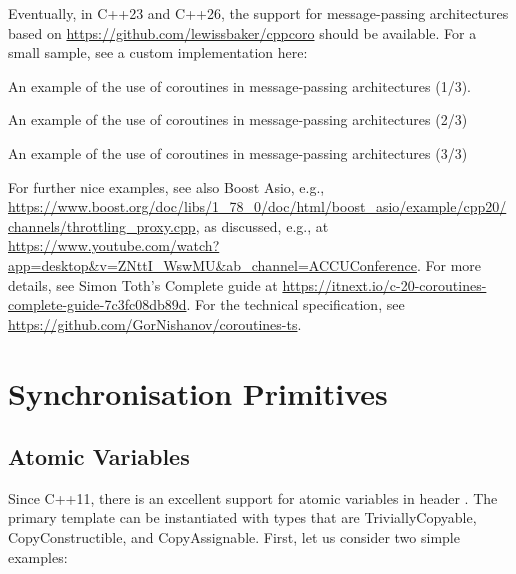 \begin{itemize}
\begin{end}
Eventually, in C++23 and C++26, the support for message-passing architectures based on \url{https://github.com/lewissbaker/cppcoro} should be available. For a small sample, see a custom implementation here:

\raggedbottom
\begin{codebox}[]{\href{https://godbolt.org/z/W8Khds7xh}{\ExternalLink}}
\footnotesize An example of the use of coroutines in message-passing architectures (1/3).
\tcblower
{}
\end{codebox}

\raggedbottom
\begin{codebox}[]{\href{https://godbolt.org/z/d3crro7hM}{\ExternalLink}}
\footnotesize An example of the use of coroutines in message-passing architectures (2/3)
\tcblower
{}
\end{codebox}

\raggedbottom
\begin{codebox}[]{\href{https://godbolt.org/z/n9Kc6TqMW}{\ExternalLink}}
\footnotesize An example of the use of coroutines in message-passing architectures (3/3)
\tcblower
{}
\end{codebox}

For further nice examples, see also Boost Asio, e.g.,
\url{https://www.boost.org/doc/libs/1_78_0/doc/html/boost_asio/example/cpp20/channels/throttling_proxy.cpp}, 
as discussed, e.g., at
\url{https://www.youtube.com/watch?app=desktop&v=ZNttI_WswMU&ab_channel=ACCUConference}.
For more details, see Simon Toth's Complete guide at \url{https://itnext.io/c-20-coroutines-complete-guide-7c3fc08db89d}.
For the technical specification, see \url{https://github.com/GorNishanov/coroutines-ts}.

\section{Synchronisation Primitives}

\subsection{Atomic Variables}
\label{sec:atomiccpp23}

Since C++11, there is an excellent support for atomic variables in header . 
The primary template can be instantiated with types that are TriviallyCopyable, CopyConstructible, and CopyAssignable.
First, let us consider two simple examples:


\end{end}
\end{itemize}
